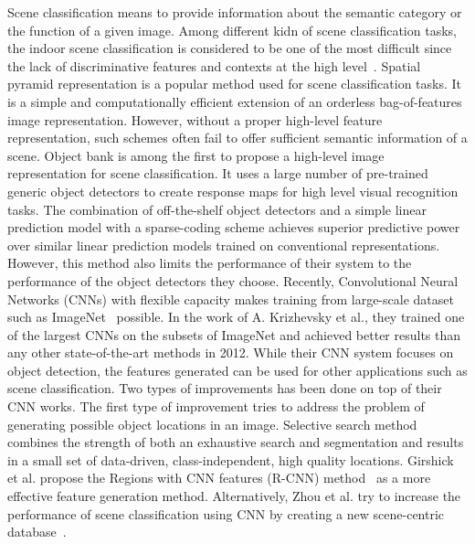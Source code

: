 
Scene classification means to provide information about the semantic category or the function of a given image. Among different kidn of scene classification tasks, the indoor scene classification is considered to be one of the most difficult since the lack of discriminative features and contexts at the high level~\cite{Quattoni:2009:RIS}. Spatial pyramid representation\cite{Lazebnik:2006:BBF} is a popular method used for scene classification tasks. It is a simple and computationally efficient extension of an orderless bag-of-features image representation. However, without a proper high-level feature representation, such schemes often fail to offer sufficient semantic information of a scene. Object bank\cite{Li:2010:OBA} is among the first to propose a high-level image representation for scene classification. It uses a large number of pre-trained generic object detectors to create response maps for high level visual recognition tasks. The combination of off-the-shelf object detectors and a simple linear prediction model with a sparse-coding scheme achieves superior predictive power over similar linear prediction models trained on conventional representations. However, this method also limits the performance of their system to the performance of the object detectors they choose. Recently, Convolutional Neural Networks (CNNs) with flexible capacity makes training from large-scale dataset such as ImageNet~\cite{Deng:2009:IAL} possible. In the work of A. Krizhevsky et al.\cite{Krizhevsky:2012:ICD}, they trained one of the largest CNNs on the subsets of ImageNet and achieved better results than any other state-of-the-art methods in 2012. While their CNN system focuses on object detection, the features generated can be used for other applications such as scene classification. Two types of improvements has been done on top of their CNN works. The first type of improvement tries to address the problem of generating possible object locations in an image. Selective search method~\cite{Uijlings:2013:SSO} combines the strength of both an exhaustive search and segmentation and results in a small set of data-driven, class-independent, high quality locations. Girshick et al. propose the Regions with CNN features (R-CNN) method~\cite{Girshick:2013:RFH} as a more effective feature generation method. Alternatively, Zhou et al. try to increase the performance of scene classification using CNN by creating a new scene-centric database~\cite{Zhou:2014:LDF}.